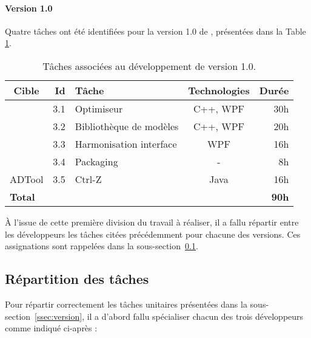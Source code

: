 \paragraph{Version 1.0} Quatre tâches ont été identifiées pour la version 1.0 de \glasir{}, présentées dans la {\sc Table} \ref{tab:taches_units_3}.
            \begin{table}[h]
                \centering
                \begin{tabular}{|c|r|l|c|r|}
                    \hline
                    \textbf{Cible} & \textbf{Id} & \textbf{Tâche} & \textbf{Technologies} & \textbf{Durée}\\
                    \hline

                    \multirow{4}{*}{\glasir{}} & 3.1 & Optimiseur & C++, WPF & 30h\\
                    \cline{2-5}
                     & 3.2 & Bibliothèque de modèles & C++, WPF & 20h\\
                    \cline{2-5}
                     & 3.3 & Harmonisation interface & WPF & 16h\\
                    \cline{2-5}
                     & 3.4 & Packaging & - & 8h\\
                    \hline

                    \multirow{1}{*}{ADTool} & 3.5 & Ctrl-Z & \multirow{1}{*}{Java} & 16h\\
                    \hline

                    \multicolumn{4}{|l|}{\bf Total} & {\bf 90h}\\
                    \hline
                \end{tabular}
                \caption{Tâches associées au développement de \glasir{} version 1.0.}
                \label{tab:taches_units_3}
            \end{table}

À l'issue de cette première division du travail à réaliser, il a fallu répartir entre les développeurs les tâches citées précédemment pour chacune des versions. Ces assignations sont rappelées dans la {\sc sous-section}~\ref{ssec:repartition}.

\subsection{Répartition des tâches}
\label{ssec:repartition}

Pour répartir correctement les tâches unitaires présentées dans la {\sc sous-section}~\ref{ssec:version}, il a d'abord fallu \og spécialiser \fg{} chacun des trois développeurs comme indiqué ci-après :

